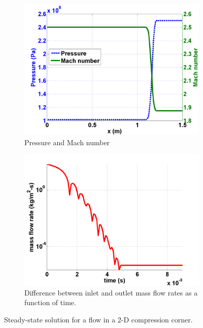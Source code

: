 \documentclass[review,10pt]{elsarticle}
\begin{document}
\begin{figure}[H]
        \begin{subfigure}[b]{0.49\textwidth}
                \centering
                \includegraphics[width=\textwidth]{figures/mach_number_pressure.png}
                \caption{Pressure and Mach number}
                \label{fig:2d_corner_isomach}
        \end{subfigure}        
        \begin{subfigure}[b]{0.49\textwidth}
                \centering
                \includegraphics[width=\textwidth]{figures/CompressionCorner2DQ.png}
                \caption{Difference between inlet and outlet mass flow rates as a function of time.}
                \label{fig:2d_convergence}
        \end{subfigure}
        \caption{Steady-state solution for a flow in a 2-D compression corner.}\label{fig:2d_corner}
\end{figure}
\end{document}
